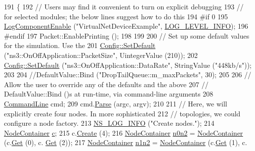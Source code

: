 \begin{DoxyCode}
191 \{
192   \textcolor{comment}{// Users may find it convenient to turn on explicit debugging}
193   \textcolor{comment}{// for selected modules; the below lines suggest how to do this}
194 \textcolor{preprocessor}{#if 0 }
195   \hyperlink{namespacens3_adc4ef4f00bb2f5f4edae67fc3bc27f20}{LogComponentEnable} (\textcolor{stringliteral}{"VirtualNetDeviceExample"}, 
      \hyperlink{namespacens3_aa6464a4d69551a9cc968e17a65f39bdbae36aedc880de94fd5a5b53bb9fe65628}{LOG\_LEVEL\_INFO});
196 \textcolor{preprocessor}{#endif}
197   Packet::EnablePrinting ();
198 
199 
200   \textcolor{comment}{// Set up some default values for the simulation.  Use the }
201   \hyperlink{group__config_ga2e7882df849d8ba4aaad31c934c40c06}{Config::SetDefault} (\textcolor{stringliteral}{"ns3::OnOffApplication::PacketSize"}, UintegerValue (210));
202   \hyperlink{group__config_ga2e7882df849d8ba4aaad31c934c40c06}{Config::SetDefault} (\textcolor{stringliteral}{"ns3::OnOffApplication::DataRate"}, StringValue (\textcolor{stringliteral}{"448kb/s"}));
203 
204   \textcolor{comment}{//DefaultValue::Bind ("DropTailQueue::m\_maxPackets", 30);}
205 
206   \textcolor{comment}{// Allow the user to override any of the defaults and the above}
207   \textcolor{comment}{// DefaultValue::Bind ()s at run-time, via command-line arguments}
208   \hyperlink{classns3_1_1CommandLine}{CommandLine} cmd;
209   cmd.\hyperlink{classns3_1_1CommandLine_a5c10b85b3207e5ecb48d907966923156}{Parse} (argc, argv);
210 
211   \textcolor{comment}{// Here, we will explicitly create four nodes.  In more sophisticated}
212   \textcolor{comment}{// topologies, we could configure a node factory.}
213   \hyperlink{group__logging_gafbd73ee2cf9f26b319f49086d8e860fb}{NS\_LOG\_INFO} (\textcolor{stringliteral}{"Create nodes."});
214   \hyperlink{classns3_1_1NodeContainer}{NodeContainer} \hyperlink{lte_2model_2fading-traces_2fading__trace__generator_8m_ae0323a9039add2978bf5b49550572c7c}{c};
215   c.\hyperlink{classns3_1_1NodeContainer_a787f059e2813e8b951cc6914d11dfe69}{Create} (4);
216   \hyperlink{classns3_1_1NodeContainer}{NodeContainer} \hyperlink{adaptive-red-tests_8cc_aeaa87dbd052b50719525adea0f586b36}{n0n2} = \hyperlink{classns3_1_1NodeContainer}{NodeContainer} (c.\hyperlink{classns3_1_1NodeContainer_a9ed96e2ecc22e0f5a3d4842eb9bf90bf}{Get} (0), c.
      \hyperlink{classns3_1_1NodeContainer_a9ed96e2ecc22e0f5a3d4842eb9bf90bf}{Get} (2));
217   \hyperlink{classns3_1_1NodeContainer}{NodeContainer} \hyperlink{adaptive-red-tests_8cc_a68f69f65725cbe7529e8b594708b8fc0}{n1n2} = \hyperlink{classns3_1_1NodeContainer}{NodeContainer} (c.\hyperlink{classns3_1_1NodeContainer_a9ed96e2ecc22e0f5a3d4842eb9bf90bf}{Get} (1), c.

\end{DoxyCode}
